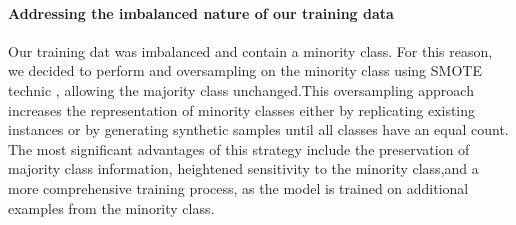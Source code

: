 \paragraph{Addressing the imbalanced nature of our training data}
Our training dat was imbalanced and contain a minority class. For this reason, we decided to perform and oversampling on the minority class using SMOTE technic , allowing the majority class unchanged.This oversampling approach increases the representation of minority classes either by replicating existing instances or by generating synthetic samples until all classes have an equal count. The most significant advantages of this strategy include the preservation of majority class information, heightened sensitivity to the minority class,and a more comprehensive training process, as the model is trained on additional examples from the minority class.

